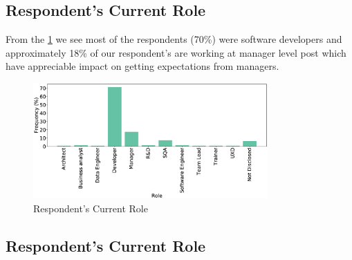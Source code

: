 \subsection{Respondent's Current Role}
From the \ref{fig:role} we see most of the respondents (70\%) were software developers and approximately 18\% of our respondent's are working at manager level post which have appreciable impact on getting expectations from managers.
\begin{figure}[H]
\centering
  \includegraphics[width=0.8\textwidth]{Figures/Respondents_Role}
  \caption{Respondent's Current Role}
  \label{fig:role}
\end{figure}

\subsection{Respondent's Current Role}